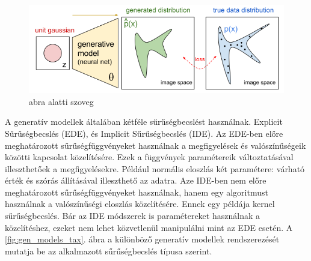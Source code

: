 \begin{figure}[ht]
	\centering
	\includegraphics[width=1\columnwidth]{figures/generative_model_math.png}
	\caption{abra alatti szoveg}
	\label{fig:data_distribution}
\end{figure}


A generatív modellek általában kétféle sűrűségbecslést használnak. Explicit Sűrűségbecslés (EDE), és Implicit Sűrűségbecslés (IDE). Az EDE-ben előre meghatározott sűrűségfüggvényeket használnak a megfigyelések és valószínűségeik közötti kapcsolat közelítésére. Ezek a függvények paramétereik változtatásával illeszthetőek a megfigyelésekre. Például normális eloszlás két paramétere: várható érték és szórás állításával illeszthető az adatra. Aze IDE-ben nem előre meghatározott sűrűségfüggvényeket használnak, hanem egy algoritmust használnak a valószínűségi eloszlás közelítésére. Ennek egy példája kernel sűrűségbecslés. Bár az IDE módszerek is paramétereket használnak a közelítéshez, ezeket nem lehet közvetlenül manipulálni mint az EDE esetén. A \ref{fig:gen_models_tax}. ábra a különböző generatív modellek rendszerezését mutatja be az alkalmazott sűrűségbecslés típusa szerint.


